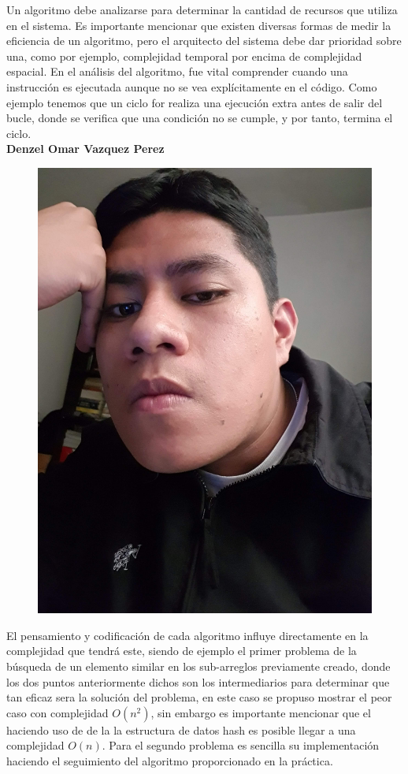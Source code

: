 \documentclass[12pt,twoside]{article}
\begin{document}
Un algoritmo debe analizarse para determinar la cantidad de recursos que utiliza en el sistema. Es importante mencionar que existen diversas formas de medir la eficiencia de un algoritmo, pero el arquitecto del sistema debe dar prioridad sobre una, como por ejemplo, complejidad temporal por encima de complejidad espacial.
En el análisis del algoritmo, fue vital comprender cuando una instrucción es ejecutada aunque no se vea explícitamente en el código. Como ejemplo tenemos que un ciclo for realiza una ejecución extra antes de salir del bucle, donde se verifica que una condición no se cumple, y por tanto, termina el ciclo.\\[1.2cm]
\textbf{\large Denzel Omar Vazquez Perez}
\begin{figure}[h]
    \centering
    \includegraphics[angle=-90, scale= 0.05]{imagenes/foto2.jpg}
\end{figure}

El pensamiento y codificaci\'on de cada algoritmo influye directamente en la complejidad que tendr\'a este, siendo de ejemplo el primer problema de la b\'usqueda de un elemento similar en los sub-arreglos previamente creado, donde los dos puntos anteriormente dichos son los intermediarios para determinar que tan eficaz sera la soluci\'on del problema, en este caso se propuso mostrar el peor caso con complejidad $O(n ^2)$, sin embargo es importante mencionar que el haciendo uso de de la la estructura de datos hash es posible llegar a una complejidad $O(n)$. Para el segundo problema es sencilla su implementaci\'on haciendo el seguimiento del algoritmo proporcionado en la pr\'actica. 
\end{document}
